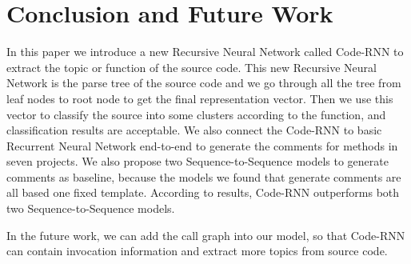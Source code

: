\section{Conclusion and Future Work}

In this paper we introduce a new Recursive Neural Network called Code-RNN to extract the topic or function of the source code. This new Recursive Neural Network is the parse tree of the source code and we go through all the tree from leaf nodes to root node to get the final representation vector. Then we use this vector to classify the source into some clusters according to the function, and classification results are acceptable. We also connect the Code-RNN to basic Recurrent Neural Network end-to-end to generate the comments for methods in seven projects. We also propose two Sequence-to-Sequence models to generate comments as baseline, because the models we found that generate comments are all based one fixed template. According to results, Code-RNN outperforms both two Sequence-to-Sequence models.

In the future work, we can add the call graph into our model, so that Code-RNN can contain invocation information and extract more topics from source code.
